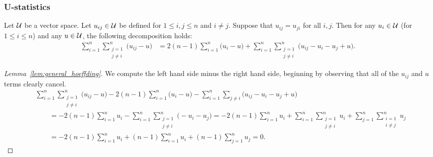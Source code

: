\subsubsection{U-statistics}

\begin{lemma}
  \label{lem:general_hoeffding}

  Let $\mathcal{U}$ be a vector space.
  Let $u_{i j} \in \mathcal{U}$ be defined for
  $1 \leq i, j \leq n$
  and
  $i \neq j$.
  Suppose that $u_{i j} = u_{j i}$
  for all $i,j$.
  Then for any $u_i \in \mathcal{U}$
  (for $1 \leq i \leq n$)
  and any $u \in \mathcal{U}$,
  the following decomposition holds:
  \begin{align*}
    \sum_{i=1}^n
    \sum_{\substack{j=1 \\ j \neq i}}^n
    \big(u_{i j} - u\big)
    &=
    2(n-1)
    \sum_{i=1}^n
    \big(u_i - u\big)
    +
    \sum_{i=1}^n
    \sum_{\substack{j=1 \\ j \neq i}}^n
    \big(u_{i j} - u_i - u_j + u\big).
  \end{align*}

\end{lemma}

\begin{proof}[Lemma~\ref{lem:general_hoeffding}]

  We compute the left hand side minus the right hand side,
  beginning by observing that all of the
  $u_{i j}$ and $u$ terms clearly cancel.
  \begin{align*}
    &\sum_{i=1}^n
    \sum_{\substack{j=1 \\ j \neq i}}^n
    \big(u_{i j} - u\big)
    - 2(n-1)
    \sum_{i=1}^n
    \big(u_i - u\big)
    -
    \sum_{i=1}^n
    \sum_{j \neq i}
    \big(u_{i j} - u_i - u_j + u\big) \\
    &\qquad=
    - 2(n-1)
    \sum_{i=1}^n
    u_i
    -
    \sum_{i=1}^n
    \sum_{\substack{j=1 \\ j \neq i}}^n
    \big(- u_i - u_j\big)
    =
    - 2(n-1)
    \sum_{i=1}^n
    u_i
    +
    \sum_{i=1}^n
    \sum_{\substack{j=1 \\ j \neq i}}^n
    u_i
    +
    \sum_{j=1}^n
    \sum_{\substack{i=1 \\ i \neq j}}^n
    u_j \\
    &\qquad=
    - 2(n-1)
    \sum_{i=1}^n
    u_i
    +
    (n-1)
    \sum_{i=1}^n
    u_i
    +
    (n-1)
    \sum_{j=1}^n
    u_j
    = 0.
  \end{align*}
\end{proof}

